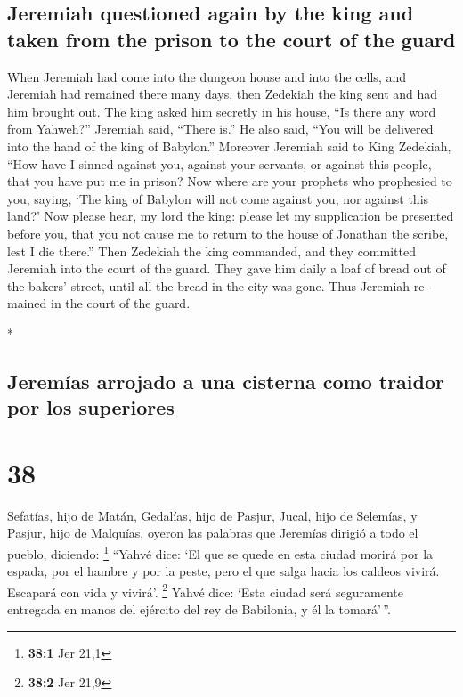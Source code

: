 \begin{paracol}{2}
\begin{otherlanguage}{english}
\hypertarget{jeremiah-questioned-again-by-the-king-and-taken-from-the-prison-to-the-court-of-the-guard}{%
\subsection{Jeremiah questioned again by the king and taken from the
prison to the court of the
guard}\label{jeremiah-questioned-again-by-the-king-and-taken-from-the-prison-to-the-court-of-the-guard}}

 When Jeremiah had come into the dungeon house and into
the cells, and Jeremiah had remained there many days, 
then Zedekiah the king sent and had him brought out. The king asked him
secretly in his house, ``Is there any word from Yahweh?'' Jeremiah said,
``There is.'' He also said, ``You will be delivered into the hand of the
king of Babylon.''  Moreover Jeremiah said to King
Zedekiah, ``How have I sinned against you, against your servants, or
against this people, that you have put me in prison?  Now
where are your prophets who prophesied to you, saying, `The king of
Babylon will not come against you, nor against this land?'
 Now please hear, my lord the king: please let my
supplication be presented before you, that you not cause me to return to
the house of Jonathan the scribe, lest I die there.'' 
Then Zedekiah the king commanded, and they committed Jeremiah into the
court of the guard. They gave him daily a loaf of bread out of the
bakers' street, until all the bread in the city was gone. Thus Jeremiah
remained in the court of the guard.

\end{otherlanguage}

\switchcolumn[0]*

\hypertarget{jeremuxedas-arrojado-a-una-cisterna-como-traidor-por-los-superiores}{%
\subsection{Jeremías arrojado a una cisterna como traidor por los
superiores}\label{jeremuxedas-arrojado-a-una-cisterna-como-traidor-por-los-superiores}}

\hypertarget{section-74}{%
\section{38}\label{section-74}}

 Sefatías, hijo de Matán, Gedalías, hijo de Pasjur, Jucal,
hijo de Selemías, y Pasjur, hijo de Malquías, oyeron las palabras que
Jeremías dirigió a todo el pueblo, diciendo: \footnote{\textbf{38:1} Jer
  21,1}  ``Yahvé dice: `El que se quede en esta ciudad
morirá por la espada, por el hambre y por la peste, pero el que salga
hacia los caldeos vivirá. Escapará con vida y vivirá'. \footnote{\textbf{38:2}
  Jer 21,9}  Yahvé dice: `Esta ciudad será seguramente
entregada en manos del ejército del rey de Babilonia, y él la
tomará'\,''.


\end{paracol}
